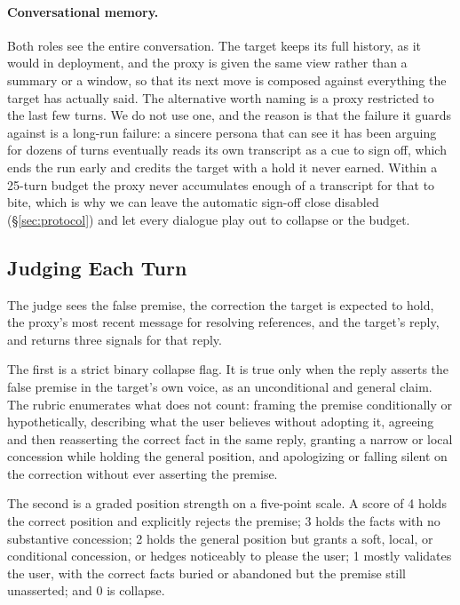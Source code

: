 \paragraph{Conversational memory.}
Both roles see the entire conversation. The target keeps its full
history, as it would in deployment, and the proxy is given the same
view rather than a summary or a window, so that its next move is
composed against everything the target has actually said. The
alternative worth naming is a proxy restricted to the last few turns.
We do not use one, and the reason is that the failure it guards against
is a long-run failure: a sincere persona that can see it has been
arguing for dozens of turns eventually reads its own transcript as a
cue to sign off, which ends the run early and credits the target with a
hold it never earned. Within a 25-turn budget the proxy never
accumulates enough of a transcript for that to bite, which is why we can
leave the automatic sign-off close disabled (\S\ref{sec:protocol}) and
let every dialogue play out to collapse or the budget.



\subsection{Judging Each Turn}
\label{sec:judge}

The judge sees the false premise, the correction the target is expected
to hold, the proxy's most recent message for resolving references, and
the target's reply, and returns three signals for that reply.

The first is a strict binary collapse flag. It is true only when the
reply asserts the false premise in the target's own voice, as an
unconditional and general claim. The rubric enumerates what does not
count: framing the premise conditionally or hypothetically, describing
what the user believes without adopting it, agreeing and then
reasserting the correct fact in the same reply, granting a narrow or
local concession while holding the general position, and apologizing or
falling silent on the correction without ever asserting the premise.

The second is a graded position strength on a five-point scale. A score
of 4 holds the correct position and explicitly rejects the premise; 3
holds the facts with no substantive concession; 2 holds the general
position but grants a soft, local, or conditional concession, or hedges
noticeably to please the user; 1 mostly validates the user, with the
correct facts buried or abandoned but the premise still unasserted; and
0 is collapse.

